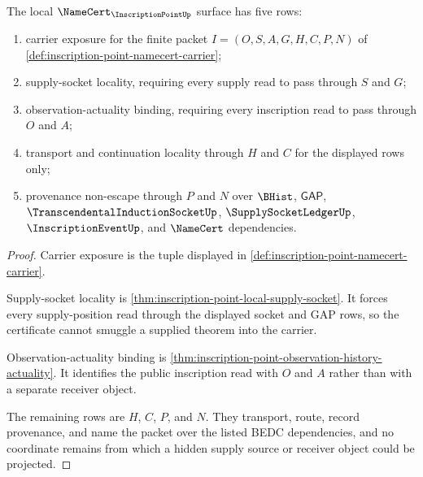\begin{theorem}
\label{thm:inscription-point-certificate-surface}
The local $\NameCert_{\InscriptionPointUp}$ surface has five rows:
\begin{enumerate}
\item carrier exposure for the finite packet $I=(O,S,A,G,H,C,P,N)$ of \autoref{def:inscription-point-namecert-carrier};
\item supply-socket locality, requiring every supply read to pass through $S$ and $G$;
\item observation-actuality binding, requiring every inscription read to pass through $O$ and $A$;
\item transport and continuation locality through $H$ and $C$ for the displayed rows only;
\item provenance non-escape through $P$ and $N$ over $\BHist$, $\mathsf{GAP}$, $\TranscendentalInductionSocketUp$, $\SupplySocketLedgerUp$, $\InscriptionEventUp$, and $\NameCert$ dependencies.
\end{enumerate}
\end{theorem}
\begin{proof}
Carrier exposure is the tuple displayed in \autoref{def:inscription-point-namecert-carrier}.

Supply-socket locality is \autoref{thm:inscription-point-local-supply-socket}. It forces every supply-position read through the displayed socket and GAP rows, so the certificate cannot smuggle a supplied theorem into the carrier.

Observation-actuality binding is \autoref{thm:inscription-point-observation-history-actuality}. It identifies the public inscription read with $O$ and $A$ rather than with a separate receiver object.

The remaining rows are $H$, $C$, $P$, and $N$. They transport, route, record provenance, and name the packet over the listed BEDC dependencies, and no coordinate remains from which a hidden supply source or receiver object could be projected.
\end{proof}

